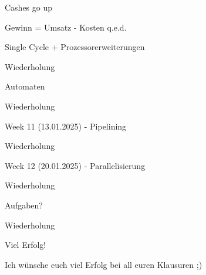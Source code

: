 \documentclass[
  german,            %
  aspectratio=169,    %
]{tumbeamer}
\begin{document}
  \begin{frame}[c]{Cashes go up}{}
	\begin{center}
	  \LARGE Gewinn = Umsatz - Kosten
	  \small q.e.d.
	\end{center}
\end{frame}


\begin{frame}[c]{Single Cycle + Prozessorerweiterungen}{}
	\begin{center}
	  \LARGE Wiederholung
	\end{center}
\end{frame}

\begin{frame}[c]{Automaten}{}
	\begin{center}
	  \LARGE Wiederholung
	\end{center}
\end{frame}

\begin{frame}[c]{Week 11 (13.01.2025) - Pipelining}{}
	\begin{center}
	  \LARGE Wiederholung
	\end{center}
\end{frame}

\begin{frame}[c]{Week 12 (20.01.2025) - Parallelisierung}{}
	\begin{center}
	  \LARGE Wiederholung
	\end{center}
\end{frame}

\begin{frame}[c]{Aufgaben?}{}
	\begin{center}
	  \LARGE Wiederholung
	\end{center}
\end{frame}

\begin{frame}[c]{Viel Erfolg!}{}
  \begin{center}
	\LARGE Ich wünsche euch viel Erfolg bei all euren Klausuren ;)
  \end{center}
\end{frame}
\end{document}
